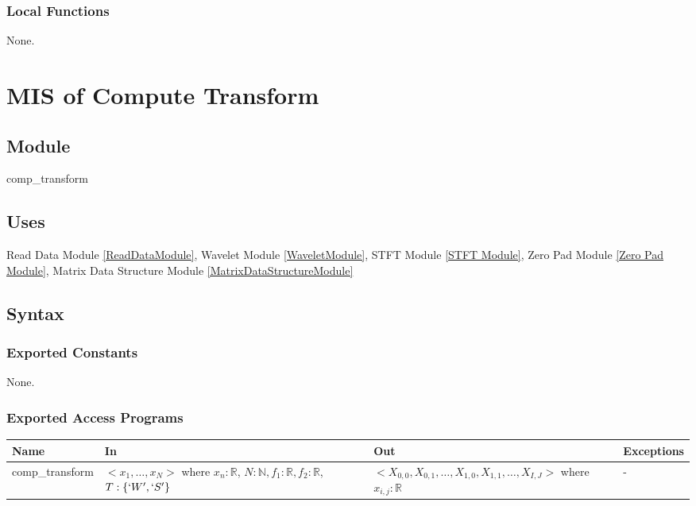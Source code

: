 \documentclass[12pt, titlepage]{article}
\begin{document}

\subsubsection{Local Functions}
None.
 
  
\section{MIS of Compute Transform} \label{CompTransformModule} 



\subsection{Module}
comp\_transform

\subsection{Uses}
Read Data Module \ref{ReadDataModule}, Wavelet Module \ref{WaveletModule}, STFT Module \ref{STFT Module}, Zero Pad Module \ref{Zero Pad Module}, Matrix Data Structure Module \ref{MatrixDataStructureModule}
\subsection{Syntax}

\subsubsection{Exported Constants}
None.
\subsubsection{Exported Access Programs}

\begin{center}
\begin{tabular}{p{3cm} p{4cm} p{5cm} p{1cm}}
\hline
\textbf{Name} & \textbf{In} & \textbf{Out} & \textbf{Exceptions} \\
\hline
comp\_transform & $<x_1,\dots,x_N>$ where $ x_n:\mathbb{R}$, $N:\mathbb{N}, f_1:
\mathbb{R}, f_2 : \mathbb{R}$, $T: \{`W',`S'\}$ & $<X_{0,0},X_{0,1},\dots, X_{1,0},X_{1,1},\dots, X_{I,J}>$ where $ x_{i,j}:\mathbb{R}$ & - \\
\hline
\end{tabular}
\end{center}
\end{document}
